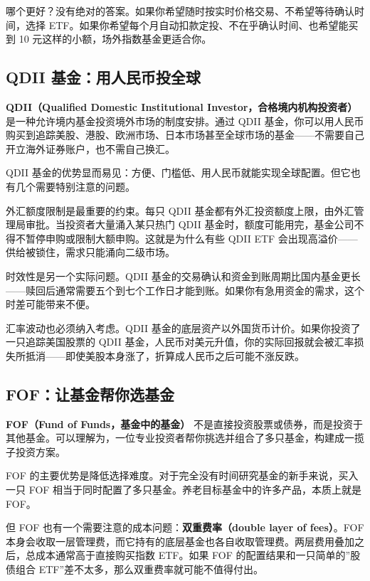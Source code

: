 \documentclass[a4paper,11pt,oneside,fontset=none,UTF8,zihao=-4]{ctexbook}
\begin{document}
哪个更好？没有绝对的答案。如果你希望随时按实时价格交易、不希望等待确认时间，选择
ETF。如果你希望每个月自动扣款定投、不在乎确认时间、也希望能买到 10
元这样的小额，场外指数基金更适合你。

\subsection{QDII
基金：用人民币投全球}\label{qdii-ux57faux91d1ux7528ux4ebaux6c11ux5e01ux6295ux5168ux7403}

\textbf{QDII（Qualified Domestic Institutional
Investor，合格境内机构投资者）}
是一种允许境内基金投资境外市场的制度安排。通过 QDII
基金，你可以用人民币购买到追踪美股、港股、欧洲市场、日本市场甚至全球市场的基金------不需要自己开立海外证券账户，也不需自己换汇。

QDII
基金的优势显而易见：方便、门槛低、用人民币就能实现全球配置。但它也有几个需要特别注意的问题。

外汇额度限制是最重要的约束。每只 QDII
基金都有外汇投资额度上限，由外汇管理局审批。当投资者大量涌入某只热门
QDII
基金时，额度可能用完，基金公司不得不暂停申购或限制大额申购。这就是为什么有些
QDII ETF 会出现高溢价------供给被锁住，需求只能涌向二级市场。

时效性是另一个实际问题。QDII
基金的交易确认和资金到账周期比国内基金更长------赎回后通常需要五个到七个工作日才能到账。如果你有急用资金的需求，这个时差可能带来不便。

汇率波动也必须纳入考虑。QDII
基金的底层资产以外国货币计价。如果你投资了一只追踪美国股票的 QDII
基金，人民币对美元升值，你的实际回报就会被汇率损失所抵消------即使美股本身涨了，折算成人民币之后可能不涨反跌。

\subsection{FOF：让基金帮你选基金}\label{fofux8ba9ux57faux91d1ux5e2eux4f60ux9009ux57faux91d1}

\textbf{FOF（Fund of Funds，基金中的基金）}
不是直接投资股票或债券，而是投资于其他基金。可以理解为，一位专业投资者帮你挑选并组合了多只基金，构建成一揽子投资方案。

FOF
的主要优势是降低选择难度。对于完全没有时间研究基金的新手来说，买入一只
FOF 相当于同时配置了多只基金。养老目标基金中的许多产品，本质上就是 FOF。

但 FOF 也有一个需要注意的成本问题：\textbf{双重费率（double layer of
fees）}。FOF
本身会收取一层管理费，而它持有的底层基金也各自收取管理费。两层费用叠加之后，总成本通常高于直接购买指数
ETF。如果 FOF 的配置结果和一只简单的''股债组合
ETF''差不太多，那么双重费率就可能不值得付出。
\end{document}
